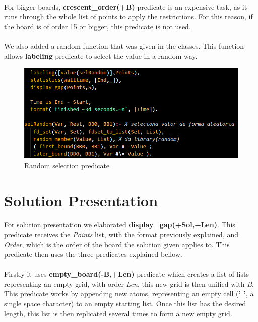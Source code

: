 \documentclass[runningheads]{llncs}
\begin{document}
\paragraph{}
For bigger boards, \textbf{crescent\_order(+B)} predicate is an expensive task, as it runs through the whole list of points to apply the restrictions.
For this reason, if the board is of order 15 or bigger, this predicate is not used.
\paragraph{}
We also added a random function that was given in the classes. This function allows \textbf{labeling} predicate to select the value in a random way.

\begin{figure}
    \begin{center}
        \includegraphics[scale=0.5]{images/random.png}
        \caption{Random selection predicate} \label{fig4}
    \end{center}
\end{figure}

\section{Solution Presentation}
\paragraph{}
For solution presentation we elaborated \textbf{display\_gap(+Sol,+Len)}. This predicate receives the \textit{Points}
list, with the format previously explained, and \textit{Order}, which is the order of the board the solution given applies to.
This predicate then uses the three predicates explained bellow.

\paragraph{}
Firstly it uses \textbf{empty\_board(-B,+Len)} predicate which creates a list of lists representing an empty grid, with order \textit{Len},
this new grid is then unified with \textit{B}.
This predicate works by appending new atoms, representing an empty cell (\textbf{' '},
a single space character) to an empty starting list. Once this list has the desired length, this list is then replicated
several times to form a new empty grid.
\end{document}
